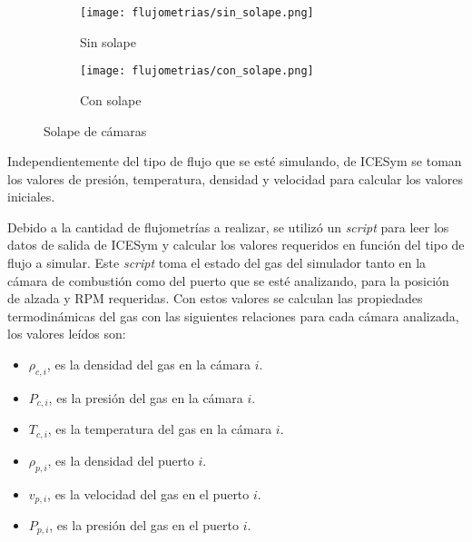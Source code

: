 \begin{figure}[t!]
  \centering
    \begin{subfigure}[t]{0.4\textwidth}
        \centering
        \texttt{[image: flujometrias/sin\_solape.png]}
        \caption{Sin solape}
    \end{subfigure}%
    \begin{subfigure}[t]{0.4\textwidth}
        \centering
        \texttt{[image: flujometrias/con\_solape.png]}
        \caption{Con solape}
    \end{subfigure}
  \caption{Solape de cámaras}\label{fig:solape}
\end{figure}

Independientemente del tipo de flujo que se esté simulando, de ICESym se toman
los valores de presión, temperatura, densidad y velocidad para calcular los
valores iniciales.

Debido a la cantidad de flujometrías a realizar, se utilizó un \emph{script} para leer
los datos de salida de ICESym y calcular los valores requeridos en función del
tipo de flujo a simular.
%
Este \emph{script} toma el estado del gas del simulador tanto en la cámara de
combustión como del puerto que se esté analizando, para la posición de alzada y
RPM requeridas.
%
Con estos valores se calculan las propiedades termodinámicas del gas con las
siguientes relaciones para cada cámara analizada, los valores leídos son:

\begin{itemize}
    \item $\rho_{c,i}$, es la densidad del gas en la cámara $i$.
    \item $P_{c,i}$, es la presión del gas en la cámara $i$.
    \item $T_{c,i}$, es la temperatura del gas en la cámara $i$.
    \item $\rho_{p,i}$, es la densidad del puerto $i$.
    \item $v_{p,i}$, es la velocidad del gas en el puerto $i$.
    \item $P_{p,i}$, es la presión del gas en el puerto $i$.
\end{itemize}


